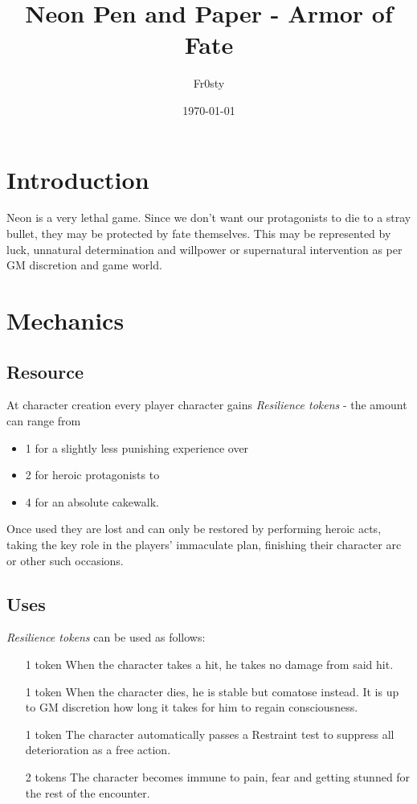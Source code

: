 \documentclass[12pt,a4paper,openany]{book}
\title{Neon Pen and Paper - Armor of Fate}
\author{Fr0sty}
\date{\today}
\begin{document}
	
	
	\chapter{Introduction}
	Neon is a very lethal game. Since we don't want our protagonists to die to a stray bullet, they may be protected by fate themselves. This may be represented by luck, unnatural determination and willpower or supernatural intervention as per GM discretion and game world.
	
	\chapter{Mechanics}
	\section{Resource}
	At character creation every player character gains \emph{Resilience tokens} - the amount can range from
	\begin{itemize}
		\item 1 for a slightly less punishing experience over
		\item 2 for heroic protagonists to
		\item 4 for an absolute cakewalk.
	\end{itemize}
	Once used they are lost and can only be restored by performing heroic acts, taking the key role in the players' immaculate plan, finishing their character arc or other such occasions.
	
	\section{Uses}
	\emph{Resilience tokens} can be used as follows:
	\begin{itemize}
		\item[1 token] When the character takes a hit, he takes no damage from said hit.
		\item[1 token] When the character dies, he is stable but comatose instead. It is up to GM discretion how long it takes for him to regain consciousness.
		\item[1 token] The character automatically passes a Restraint test to suppress all deterioration as a free action.
		\item[2 tokens] The character becomes immune to pain, fear and getting stunned for the rest of the encounter.
	\end{itemize}
\end{document}

